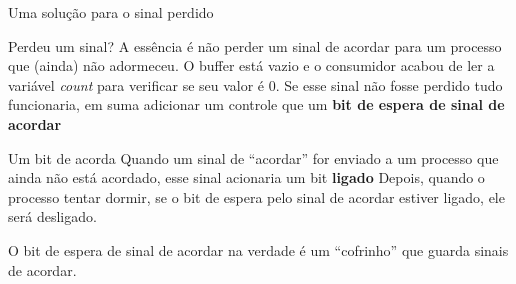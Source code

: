 \documentclass[11pt]{beamer}
\begin{document}

\begin{frame}{ Uma solução para o sinal perdido}

\begin{block}{ Perdeu um sinal?}
  A essência é não perder um sinal de acordar  para um processo que (ainda) não adormeceu.
  O buffer está vazio e o consumidor acabou de ler a variável \textit{count} para verificar se seu valor é 0.
  \pause
  Se esse sinal não fosse perdido tudo funcionaria, em suma adicionar um controle que um \textbf{bit de espera de sinal de acordar}
 \end{block}

 \pause
\begin{block}{ Um bit de acorda}
 Quando um sinal de ``acordar'' for enviado a um processo que ainda não está acordado, esse sinal acionaria um bit \textbf{ligado}
 \pause
 Depois, quando o processo tentar dormir, se o bit de espera pelo sinal de acordar estiver ligado, ele será desligado.
\end{block}
\pause
 O bit de espera de sinal de acordar na verdade é um ``cofrinho'' que guarda sinais de acordar.
\end{frame}
\end{document}
